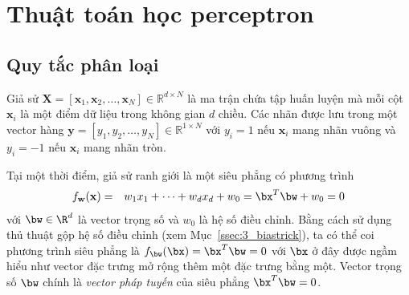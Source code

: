  
\section{Thuật toán học perceptron}

 
 
\subsection{Quy tắc phân loại}
Giả sử $\mathbf{X} = [\mathbf{x}_1, \mathbf{x}_2, \dots, \mathbf{x}_N] \in \mathbb{R}^{d \times N}$ là ma trận chứa tập huấn luyện mà mỗi cột $\mathbf{x}_i$ là một điểm dữ liệu trong không gian $d$ chiều. 
Các nhãn được lưu trong một vector hàng $\mathbf{y} = [y_1, y_2, \dots, y_N] \in \mathbb{R}^{1\times N}$ với $y_i = 1$ nếu $\mathbf{x}_i$ mang nhãn vuông và $y_i = -1$ nếu $\mathbf{x}_i$ mang nhãn tròn.
 
Tại một thời điểm, giả sử ranh giới là một siêu phẳng có phương trình
\begin{eqnarray} 
    f_{\mathbf{w}}(\mathbf{x}) &=& w_1x_1 + \dots + w_dx_d + w_0 =\bx^T\bw + w_0 = 0
\end{eqnarray} 
với $\bw \in \R^d$ là vector trọng số và $w_0$ là hệ số điều chỉnh. Bằng cách sử dụng thủ thuật gộp hệ số điều chỉnh (xem Mục~\ref{ssec:3_biastrick}), ta có thể coi phương trình siêu phẳng là
$f_{\bw}(\bx) = \bx^T\bw = 0$ với $\bx$ ở đây được ngầm hiểu như vector đặc
trưng mở rộng thêm một đặc trưng bằng một. Vector trọng số $\bw$ chính là
\textit{vector pháp tuyến} của siêu phẳng $\bx^T\bw = 0$.


 

